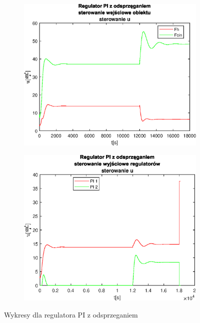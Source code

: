 \begin{figure}[h!]
   \begin{subfigure}[b]{0.4\textwidth}
      \includegraphics[width=1\linewidth]{img/PI/decoupler/PIDecouplerControl1.eps}
      \caption{}
      \label{fig:fig:stepResponsesFh13}
   \end{subfigure}
       
   \begin{subfigure}[b]{0.4\textwidth}
      \includegraphics[width=1\linewidth]{img/PI/decoupler/PIDecouplerControlD1.eps}
      \caption{}
      \label{fig:fig:stepResponsesFh14}
   \end{subfigure}
       
   \caption{Wykresy dla regulatora PI z odsprzeganiem}
   \label{fig:stepResponsesFh1}
\end{figure}
           
